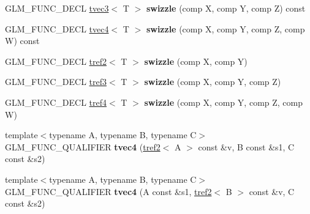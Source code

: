 \begin{DoxyCompactItemize}
\item 
\hypertarget{structglm_1_1detail_1_1tvec4_ad3e7a2acd80f64d62fedef583cd607dd}{}G\+L\+M\+\_\+\+F\+U\+N\+C\+\_\+\+D\+E\+C\+L \hyperlink{structglm_1_1detail_1_1tvec3}{tvec3}$<$ T $>$ {\bfseries swizzle} (comp X, comp Y, comp Z) const \label{structglm_1_1detail_1_1tvec4_ad3e7a2acd80f64d62fedef583cd607dd}

\item 
\hypertarget{structglm_1_1detail_1_1tvec4_a789482aae1e29ca3f5b8fa4deeb0b319}{}G\+L\+M\+\_\+\+F\+U\+N\+C\+\_\+\+D\+E\+C\+L \hyperlink{structglm_1_1detail_1_1tvec4}{tvec4}$<$ T $>$ {\bfseries swizzle} (comp X, comp Y, comp Z, comp W) const \label{structglm_1_1detail_1_1tvec4_a789482aae1e29ca3f5b8fa4deeb0b319}

\item 
\hypertarget{structglm_1_1detail_1_1tvec4_a26ffc9549f4c33f12d74e55da0444f55}{}G\+L\+M\+\_\+\+F\+U\+N\+C\+\_\+\+D\+E\+C\+L \hyperlink{structglm_1_1detail_1_1tref2}{tref2}$<$ T $>$ {\bfseries swizzle} (comp X, comp Y)\label{structglm_1_1detail_1_1tvec4_a26ffc9549f4c33f12d74e55da0444f55}

\item 
\hypertarget{structglm_1_1detail_1_1tvec4_a8e714a52b5fd756328b0fc1c6a3b2b62}{}G\+L\+M\+\_\+\+F\+U\+N\+C\+\_\+\+D\+E\+C\+L \hyperlink{structglm_1_1detail_1_1tref3}{tref3}$<$ T $>$ {\bfseries swizzle} (comp X, comp Y, comp Z)\label{structglm_1_1detail_1_1tvec4_a8e714a52b5fd756328b0fc1c6a3b2b62}

\item 
\hypertarget{structglm_1_1detail_1_1tvec4_aa9301374ce40ac20d6274ba4591e7f4a}{}G\+L\+M\+\_\+\+F\+U\+N\+C\+\_\+\+D\+E\+C\+L \hyperlink{structglm_1_1detail_1_1tref4}{tref4}$<$ T $>$ {\bfseries swizzle} (comp X, comp Y, comp Z, comp W)\label{structglm_1_1detail_1_1tvec4_aa9301374ce40ac20d6274ba4591e7f4a}

\item 
\hypertarget{structglm_1_1detail_1_1tvec4_a4965e30cabe5201ff1f26ce8598b29de}{}{\footnotesize template$<$typename A, typename B, typename C$>$ }\\G\+L\+M\+\_\+\+F\+U\+N\+C\+\_\+\+Q\+U\+A\+L\+I\+F\+I\+E\+R {\bfseries tvec4} (\hyperlink{structglm_1_1detail_1_1tref2}{tref2}$<$ A $>$ const \&v, B const \&s1, C const \&s2)\label{structglm_1_1detail_1_1tvec4_a4965e30cabe5201ff1f26ce8598b29de}

\item 
\hypertarget{structglm_1_1detail_1_1tvec4_a7a668eac64d210f203a857e768e8eccd}{}{\footnotesize template$<$typename A, typename B, typename C$>$ }\\G\+L\+M\+\_\+\+F\+U\+N\+C\+\_\+\+Q\+U\+A\+L\+I\+F\+I\+E\+R {\bfseries tvec4} (A const \&s1, \hyperlink{structglm_1_1detail_1_1tref2}{tref2}$<$ B $>$ const \&v, C const \&s2)\label{structglm_1_1detail_1_1tvec4_a7a668eac64d210f203a857e768e8eccd}


\end{DoxyCompactItemize}
